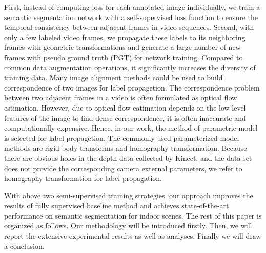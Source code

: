First, instead of computing loss for each annotated image individually, we train a semantic segmentation network with a self-supervised loss function to ensure the temporal consistency between adjacent frames in video sequences.
%
Second, with only a few labeled video frames, we propagate these labels to its neighboring frames with geometric transformations and generate a large number of new frames with pseudo ground truth (PGT) for network training. 
Compared to common data augmentation operations, it significantly increases the diversity of training data.
%
Many image alignment methods could be used to build correspondence of two images for label propagetion.
%
The correspondence problem between two adjacent frames in a video is often formulated as optical flow estimation. 
%
However, due to optical flow eatimation depends on the low-level features of the image to find dense correspondence, it is often inaccurate and computationally expensive.
%
Hence, in our work, the method of parametric model is selected for label propagetion.
%
The commonly used parameterized model methods are rigid body transforms and homography transformation.
%
Because there are obvious holes in the depth data collected by Kinect, and the data set does not provide the corresponding camera external parameters,
%
we refer to homography transformation for label propagation.

With above two semi-supervised training strategies, our approach improves the results of fully supervised baseline method and achieves state-of-the-art performance on semantic segmentation for indoor scenes. 
%
The rest of this paper is organized as follows.
% 
Our methodology will be introduced firstly.
%
Then, we will report the extensive experimental results as well as analyses. 
%
Finally we will draw a conclusion.
